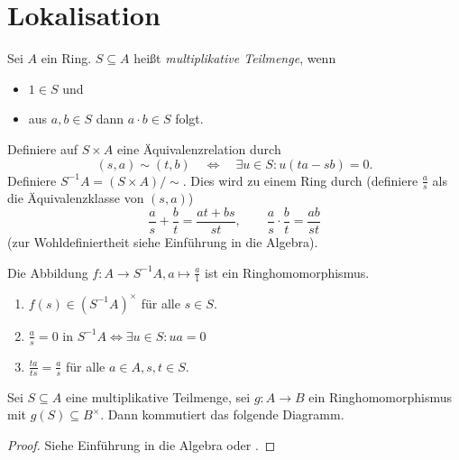 \documentclass[12pt,a4paper]{scrartcl}
\theoremstyle{cplain}
\theoremstyle{cdef}
\begin{document}

\section{Lokalisation}
\begin{defi}
	Sei $A$ ein Ring. $S\subseteq A$ heißt \emph{multiplikative Teilmenge}, wenn
	\begin{itemize}
		\item $1\in S$ und
		\item aus $a,b\in S$ dann $a\cdot b \in S$ folgt.
	\end{itemize}
	Definiere auf $S\times A$ eine Äquivalenzrelation durch
	\[(s,a) \sim (t,b) \quad \Longleftrightarrow \quad \exists u\in S: u(ta-sb) = 0.\]
	Definiere $S^{-1}A = (S\times A)/\sim$. Dies wird zu einem Ring durch (definiere $\frac as$ als die Äquivalenzklasse von $(s,a)$)
	\[\frac as+\frac bt = \frac {at+bs}{st},\qquad \frac as\cdot \frac bt = \frac{ab}{st}\]
	(zur Wohldefiniertheit siehe Einführung in die Algebra).
	
	Die Abbildung $f\colon A\to S^{-1}A, a\mapsto \frac a1$ ist ein Ringhomomorphismus.
\end{defi}
\begin{bem}
	\leavevmode
	\begin{enumerate}
		\item $f(s)\in (S^{-1}A)^{\times}$ für alle $s\in S$.
		\item $\frac as = 0$ in $S^{-1}A\Leftrightarrow \exists u\in S: ua = 0$
		\item $\frac{ta}{ts} = \frac as$ für alle $a\in A, s,t\in S$.
	\end{enumerate}
\end{bem}
\begin{satz}
	Sei $S\subseteq A$ eine multiplikative Teilmenge, sei $g\colon A\to B$ ein Ringhomomorphismus mit $g(S) \subseteq B^{\times}$. Dann kommutiert das folgende Diagramm.
	\begin{center}
	\end{center}
\end{satz}
\begin{proof}
	Siehe Einführung in die Algebra oder \cite[Proposition 3.1]{atiyah-macdonald}.
\end{proof}
\end{document}
